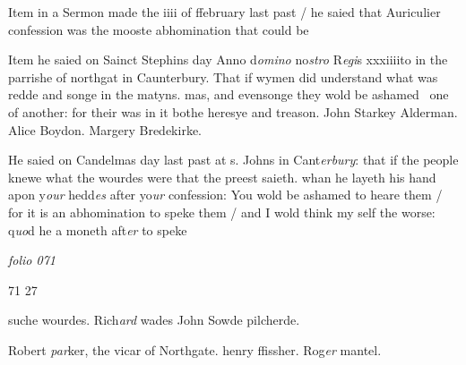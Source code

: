 \documentclass[12pt, a4paper]{book}
\begin{document}
		\ifthenelse{\isodd{\thepage}}
		{\reversemarginpar}
		{\normalmarginpar}
		Item in a Sermon made the iiii of ffebruary
 last past / he saied that Auriculier confession was
 the mooste abhomination that could be
 
 	
				\marginpar[\vspace{0.5cm}{\textcolor{Gray}{offensive}}]{}
			
 	
		\ifthenelse{\isodd{\thepage}}
		{\reversemarginpar}
		{\normalmarginpar}
		Item he saied on Sainct Stephins day Anno d\textit{omino}
 no\textit{stro} R\textit{egi}s xxxiiiito in the parrishe of northgat in
 	Caunterbury. That if wymen did understand
 what was redde and songe in the matyns. mas,
 and evensonge they wold be ashamed  one of
 another: for their was in it bothe heresye
 and treason. John Starkey Alderman. Alice Boydon.
 	Margery Bredekirke.
			
 
 
 	
			
 	
		\ifthenelse{\isodd{\thepage}}
		{\reversemarginpar}
		{\normalmarginpar}
		 He saied on Candelmas day last past at s. Johns
 in Cant\textit{erbury}: that if the people knewe what the
 wourdes were that the preest saieth. whan he layeth
 his hand apon y\textit{our} hedd\textit{es} after yo\textit{ur} confession: You
 wold be ashamed to heare them / for it is an
 abhomination to speke them / and I wold think
 my self the worse: q\textit{uo}d he a moneth aft\textit{er} to speke



\dotfill
						\newpage
{}

\textit{folio 071}


\begin{flushright}{\color{Mahogany}71} 27\end{flushright}
	
		\ifthenelse{\isodd{\thepage}}
		{\reversemarginpar}
		{\normalmarginpar}
		suche wourdes. Rich\textit{ard }wades John Sowde  pilcherde.
			
		Robert \textit{par}ker, the vicar of Northgate. henry ffissher. Rog\textit{er}
	 mantel.
 
 	
				\marginpar[\vspace{0.5cm}{\textcolor{Gray}{Confession}}]{}
			
\end{document}
